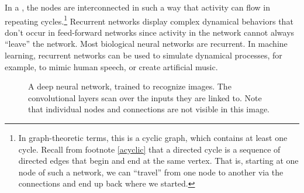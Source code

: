 
In a , the nodes are interconnected in such a way that activity can flow in repeating cycles.\footnote{In graph-theoretic terms, this is a cyclic graph, which contains at least one cycle. Recall from footnote \ref{acyclic} that a directed cycle is a sequence of directed edges that begin and end at the same vertex. That is, starting at one node of such a network, we can ``travel'' from one node to another via the connections and end up back where we started.} Recurrent networks display complex dynamical behaviors that don't occur in feed-forward networks since activity in the network cannot always ``leave'' the network. Most biological neural networks are recurrent. In machine learning, recurrent networks can be used to simulate dynamical processes, for example,  to mimic human speech, or create artificial music.

\begin{figure}[h]
\centering
{}
\caption[Adapted from a creative commons image by Aphex34 at  ]{A deep neural network, trained to recognize images. The convolutional layers scan over the inputs they are linked to. Note that individual nodes and connections are not visible in this image.}
\label{deep_net}
\end{figure}


